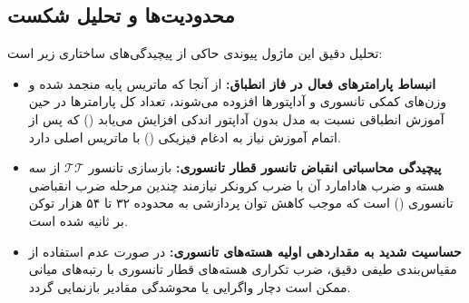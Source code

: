 \subsection{محدودیت‌ها و تحلیل شکست}
تحلیل دقیق این ماژول پیوندی حاکی از پیچیدگی‌های ساختاری زیر است:
\begin{itemize}
    \item \textbf{انبساط پارامترهای فعال در فاز انطباق:} از آنجا که ماتریس پایه منجمد شده و وزن‌های کمکی تانسوری و آداپتورها افزوده می‌شوند، تعداد کل پارامترها در حین آموزش انطباقی نسبت به مدل بدون آداپتور اندکی افزایش می‌یابد () که پس از اتمام آموزش نیاز به ادغام فیزیکی () با ماتریس اصلی دارد.
    \item \textbf{پیچیدگی محاسباتی انقباض تانسور قطار تانسوری:} بازسازی تانسور $\mathcal{TT}$ از سه هسته و ضرب هادامارد آن با ضرب کرونکر نیازمند چندین مرحله ضرب انقباضی تانسوری () است که موجب کاهش توان پردازشی به محدوده ۳۲ تا ۵۴ هزار توکن بر ثانیه شده است.
    \item \textbf{حساسیت شدید به مقداردهی اولیه هسته‌های تانسوری:} در صورت عدم استفاده از مقیاس‌بندی طیفی دقیق، ضرب تکراری هسته‌های قطار تانسوری با رتبه‌های میانی ممکن است دچار واگرایی یا محوشدگی مقادیر بازنمایی گردد.
\end{itemize}
